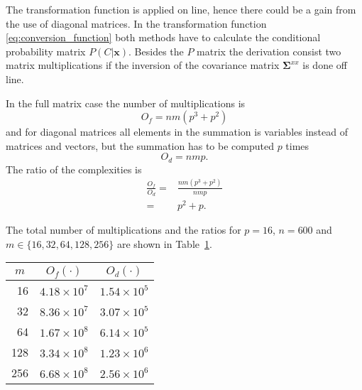 The transformation function is applied on line, hence there could be a gain from the use of diagonal matrices. In the transformation function \eqref{eq:conversion_function} both methods have to calculate the conditional probability matrix $P(C\vert \mathbf{x})$. Besides the $P$ matrix the derivation consist two matrix multiplications if the inversion of the covariance matrix $\mathbf{\Sigma}^{xx}$ is done off line.

In the full matrix case the number of multiplications is
\begin{equation}
	O_f = nm(p^3 + p^2)
\end{equation}
and for diagonal matrices all elements in the summation is variables instead of matrices and vectors, but the summation has to be computed $p$ times
\begin{equation}
	O_d = nmp.
\end{equation}
The ratio of the complexities is
\begin{equation}
	\begin{split}
		\frac{O_f}{O_d} = & \frac{nm(p^3 + p^2)}{nmp} \\
		= & p^2 + p.
	\end{split}
\end{equation}

The total number of multiplications and the ratios for $p=16$, $n=600$ and $m\in \{16,32,64,128,256\}$ are shown in Table~\ref{tab:derivation_complexity}.
\begin{table}[ht]
	\begin{center}
		\begin{tabular}{rll}
			\toprule
			\multicolumn{1}{c}{$m$} & \multicolumn{1}{c}{$O_f(\cdot)$} & \multicolumn{1}{c}{$O_d(\cdot)$} \\
			\midrule
			16 & $4.18 \times 10^7$ & $1.54 \times 10^5$ \\
			32 & $8.36 \times 10^7$ & $3.07 \times 10^5$ \\
			64 & $1.67 \times 10^8$ & $6.14 \times 10^5$ \\
			128 & $3.34 \times 10^8$ & $1.23 \times 10^6$ \\
			256 & $6.68 \times 10^8$ & $2.56 \times 10^6$ \\
			\bottomrule			
		\end{tabular}		
	\end{center}
\label{tab:derivation_complexity}	
\end{table}

